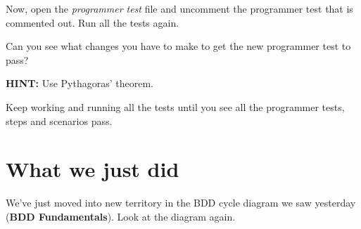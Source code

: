     
    Now, open the \emph{programmer test} file and uncomment the programmer test that is commented out. Run all the tests again.
    
    
    Can you see what changes you have to make to get the new programmer test to pass?  
    
    \textbf{HINT:} Use Pythagoras' theorem.
    
    Keep working and running all the tests until you see all the programmer tests, steps and scenarios pass.
    
    \section*{What we just did}
    
    We've just moved into new territory in the BDD cycle diagram we saw yesterday (\textbf{BDD Fundamentals}). Look at the diagram again. 
    
    
\fi